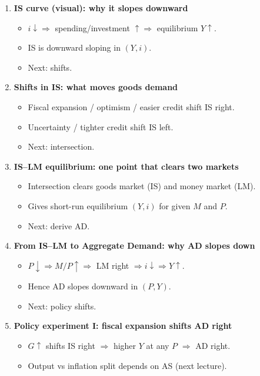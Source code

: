 \documentclass[11pt]{article}
\begin{document}
\begin{enumerate}
\item \textbf{IS curve (visual): why it slopes downward}
\begin{itemize}
\item $i\downarrow \Rightarrow$ spending/investment $\uparrow \Rightarrow$ equilibrium $Y\uparrow$.
\item IS is downward sloping in $(Y,i)$.
\item Next: shifts.
\end{itemize}

\item \textbf{Shifts in IS: what moves goods demand}
\begin{itemize}
\item Fiscal expansion / optimism / easier credit shift IS right.
\item Uncertainty / tighter credit shift IS left.
\item Next: intersection.
\end{itemize}

\item \textbf{IS--LM equilibrium: one point that clears two markets}
\begin{itemize}
\item Intersection clears goods market (IS) and money market (LM).
\item Gives short-run equilibrium $(Y,i)$ for given $M$ and $P$.
\item Next: derive AD.
\end{itemize}

\item \textbf{From IS--LM to Aggregate Demand: why AD slopes down}
\begin{itemize}
\item $P\downarrow \Rightarrow M/P\uparrow \Rightarrow$ LM right $\Rightarrow i\downarrow \Rightarrow Y\uparrow$.
\item Hence AD slopes downward in $(P,Y)$.
\item Next: policy shifts.
\end{itemize}

\item \textbf{Policy experiment I: fiscal expansion shifts AD right}
\begin{itemize}
\item $G\uparrow$ shifts IS right $\Rightarrow$ higher $Y$ at any $P$ $\Rightarrow$ AD right.
\item Output vs inflation split depends on AS (next lecture).
\end{itemize}


\end{enumerate}
\end{document}
